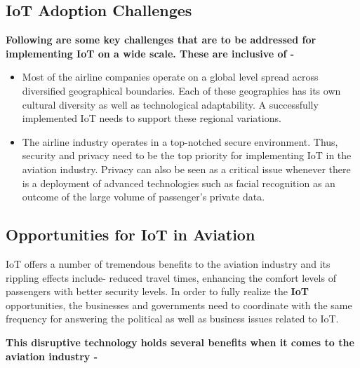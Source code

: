 \documentclass[a4paper,12pt]{article}
\begin{document}
\subsection{IoT Adoption Challenges}

\textbf{Following are some key challenges that are to be addressed for implementing IoT on a wide scale. These are inclusive of -}

\begin{itemize}
\item{ Most of the airline companies operate on a global level spread across diversified geographical boundaries. Each of these geographies has its own cultural diversity as well as technological adaptability. A successfully implemented IoT needs to support these regional variations.}
\item{ The airline industry operates in a top-notched secure environment. Thus, security and privacy need to be the top priority for implementing IoT in the aviation industry. Privacy can also be seen as a critical issue whenever there is a deployment of advanced technologies such as facial recognition as an outcome of the large volume of passenger’s private data.}
\end{itemize}

\subsection{Opportunities for IoT in Aviation}

IoT offers a number of tremendous benefits to the aviation industry and its rippling effects include- reduced travel times, enhancing the comfort levels of passengers with better security levels. In order to fully realize the \textbf{IoT} opportunities, the businesses and governments need to coordinate with the same frequency for answering the political as well as business issues related to IoT.

\noindent \textbf{This disruptive technology holds several benefits when it comes to the aviation industry -}
\end{document}
